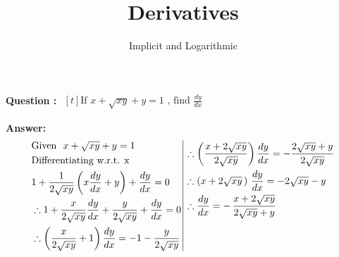 \documentclass{beamer}
\title{Derivatives}
\subtitle{Implicit and Logarithmic}
\begin{document}
 

\frame {
		\titlepage
	}



\frame
{
\textbf{Question :} 
$\begin{aligned}[t] 
\text{If \ } x + \sqrt{xy} + y = 1 \text{\ , \  find \ \  } \frac{dy}{dx}
\end{aligned}$

\textbf{Answer:}
\begin{equation} \nonumber
\begin{alignedat}{4}
& \text{Given \ } x + \sqrt{xy} + y = 1 \\
& \text{Differentiating w.r.t. x \ }\\
& 1 + \frac{1}{2\sqrt{xy}} \left( x\frac{dy}{dx}+y \right)+\frac{dy}{dx}=0 \\
& \therefore 1 + \frac{x}{2\sqrt{xy}} \frac{dy}{dx}+ \frac{y}{2\sqrt{xy}}+\frac{dy}{dx}=0 \\
& \therefore \left(\frac{x}{2\sqrt{xy}}+1\right) \frac{dy}{dx}=-1-\frac{y}{2\sqrt{xy}}\\
\end{alignedat}
\,
\vrule
\, 
\begin{alignedat}{4}
& \therefore \left(\frac{x+2\sqrt{xy}}{2\sqrt{xy}}\right) \frac{dy}{dx}=-\frac{2\sqrt{xy}+y}{2\sqrt{xy}}\\
& \therefore  (x+2\sqrt{xy}\,)\ \frac{dy}{dx}= -2\sqrt{xy}-y \\
& \therefore \frac{dy}{dx} =-\,\frac{x+2\sqrt{xy}}{2\sqrt{xy}+y}  \\
& \\
& \\
\end{alignedat}
\end{equation}

}

\end{document}
